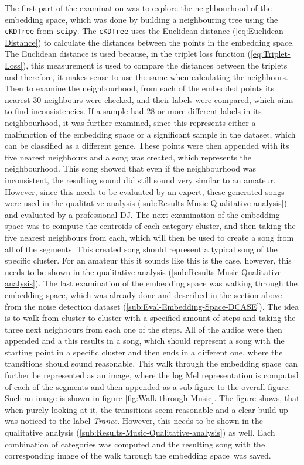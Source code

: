 The first part of the examination was to explore the neighbourhood of the embedding space, which was done by building a neighbouring tree using the \texttt{cKDTree} from \texttt{scipy}. The \texttt{cKDTree} uses the Euclidean distance (\ref{eq:Euclidean-Distance}) to calculate the distances between the points in the embedding space. The Euclidean distance is used because, in the triplet loss function (\ref{eq:Triplet-Loss}), this measurement is used to compare the distances between the triplets and therefore, it makes sense to use the same when calculating the neighbours. Then to examine the neighbourhood, from each of the embedded points its nearest 30 neighbours were checked, and their labels were compared, which aims to find inconsistencies. If a sample had 28 or more different labels in its neighbourhood, it was further examined, since this represents either a malfunction of the embedding space or a significant sample in the dataset, which can be classified as a different genre. These points were then appended with its five nearest neighbours and a song was created, which represents the neighbourhood. This song showed that even if the neighbourhood was inconsistent, the resulting sound did still sound very similar to an amateur. However, since this needs to be evaluated by an expert, these generated songs were used in the qualitative analysis (\ref{sub:Results-Music-Qualitative-analysis}) and evaluated by a professional DJ.
\newline
\newline
The next examination of the embedding space was to compute the centroids of each category cluster, and then taking the five nearest neighbours from each, which will then be used to create a song from all of the segments. This created song should represent a typical song of the specific cluster. For an amateur this it sounds like this is the case, however, this needs to be shown in the qualitative analysis (\ref{sub:Results-Music-Qualitative-analysis}).
\newline
\newline
The last examination of the embedding space was walking through the embedding space, which was already done and described in the section above from the noise detection dataset (\ref{sub:Eval-Embedding-Space-DCASE}). The idea is to walk from cluster to cluster with a specified amount of steps and taking the three next neighbours from each one of the steps. All of the audios were then appended and a this results in a song, which should represent a song with the starting point in a specific cluster and then ends in a different one, where the transitions should sound reasonable. This \flqq walk through the embedding space\frqq \ can further be represented as an image, where the log Mel representation is computed of each of the segments and then appended as a sub-figure to the overall figure. Such an image is shown in figure \ref{fig:Walk-through-Music}. The figure shows, that when purely looking at it, the transitions seem reasonable and a clear build up was noticed to the label \textit{Trance}. However, this needs to be shown in the qualitative analysis (\ref{sub:Results-Music-Qualitative-analysis}) as well. Each combination of categories was computed and the resulting song with the corresponding image of the \flqq walk through the embedding space\frqq \ was saved.
